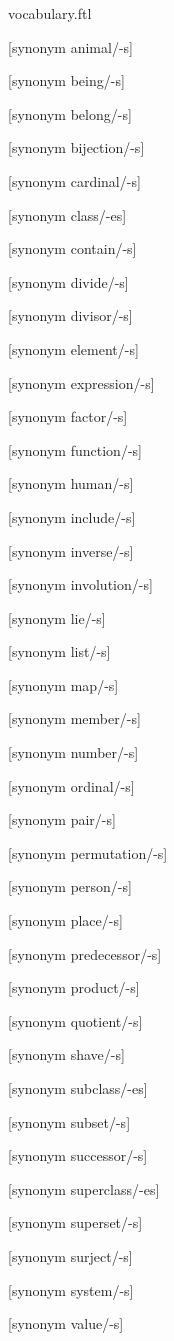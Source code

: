 \documentclass{stex}
\begin{document}
\begin{smodule}{vocabulary.ftl}
  \begin{forthel}

    [synonym animal/-s]

    [synonym being/-s]

    [synonym belong/-s]

    [synonym bijection/-s]

    [synonym cardinal/-s]

    [synonym class/-es]

    [synonym contain/-s]

    [synonym divide/-s]

    [synonym divisor/-s]

    [synonym element/-s]

    [synonym expression/-s]

    [synonym factor/-s]

    [synonym function/-s]

    [synonym human/-s]

    [synonym include/-s]

    [synonym inverse/-s]

    [synonym involution/-s]

    [synonym lie/-s]

    [synonym list/-s]

    [synonym map/-s]

    [synonym member/-s]

    [synonym number/-s]

    [synonym ordinal/-s]

    [synonym pair/-s]

    [synonym permutation/-s]

    [synonym person/-s]

    [synonym place/-s]

    [synonym predecessor/-s]

    [synonym product/-s]

    [synonym quotient/-s]
    
    [synonym shave/-s]

    [synonym subclass/-es]

    [synonym subset/-s]

    [synonym successor/-s]

    [synonym superclass/-es]

    [synonym superset/-s]

    [synonym surject/-s]

    [synonym system/-s]

    [synonym value/-s]
  \end{forthel}
\end{smodule}
\end{document}
